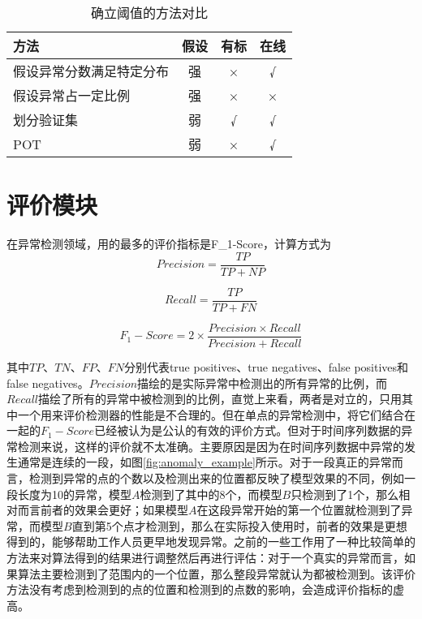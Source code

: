 \begin{table}[htbp]
  \centering
  \begin{tabular}{lccc}
    \toprule
    方法 & 假设 & 有标 & 在线 \\
    \midrule
    假设异常分数满足特定分布 & 强 & × & √ \\
    假设异常占一定比例 & 强 & × & × \\
    划分验证集 & 弱 & √ & √ \\
    POT & 弱 & × & √\\
    \bottomrule
   \end{tabular}
   \caption{确立阈值的方法对比}
   \label{tab:threshold}
\end{table}

\section{评价模块}
在异常检测领域，用的最多的评价指标是F\_1-Score，计算方式为
\begin{equation*}
  Precision = \frac{TP}{TP + NP}
\end{equation*}

\begin{equation*}
  Recall = \frac{TP}{TP + FN}
\end{equation*}

\begin{equation*}
  F_1-Score = 2\times \frac { Precision \times Recall}{Precision + Recall}
\end{equation*}

其中$TP$、$TN$、$FP$、$FN$分别代表true positives、true negatives、false positives和 false negatives。$Precision$描绘的是实际异常中检测出的所有异常的比例，而$Recall$描绘了所有的异常中被检测到的比例，直觉上来看，两者是对立的，只用其中一个用来评价检测器的性能是不合理的。但在单点的异常检测中，将它们结合在一起的$F_1-Score$已经被认为是公认的有效的评价方式。但对于时间序列数据的异常检测来说，这样的评价就不太准确。主要原因是因为在时间序列数据中异常的发生通常是连续的一段，如图\ref{fig:anomaly_example}所示。对于一段真正的异常而言，检测到异常的点的个数以及检测出来的位置都反映了模型效果的不同，例如一段长度为10的异常，模型$A$检测到了其中的8个，而模型$B$只检测到了1个，那么相对而言前者的效果会更好；如果模型$A$在这段异常开始的第一个位置就检测到了异常，而模型$B$直到第5个点才检测到，那么在实际投入使用时，前者的效果是更想得到的，能够帮助工作人员更早地发现异常。之前的一些工作\cite{xu2018unsupervised}\cite{su2019robust}用了一种比较简单的方法来对算法得到的结果进行调整然后再进行评估：对于一个真实的异常而言，如果算法主要检测到了范围内的一个位置，那么整段异常就认为都被检测到。该评价方法没有考虑到检测到的点的位置和检测到的点数的影响，会造成评价指标的虚高。

